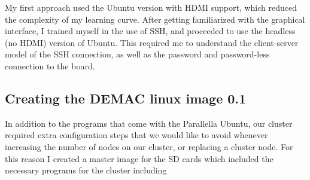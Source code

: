 \documentclass[letterpaper,12pt]{article}
\begin{document}
My first approach used the Ubuntu version with HDMI support, which reduced the complexity of my learning curve. After getting familiarized with the graphical interface, I trained myself in the use of SSH, and proceeded to use the headless (no HDMI) version of Ubuntu. This required me to understand the client-server model of the SSH connection, as well as the password and password-less connection to the board.

\subsection{Creating the DEMAC linux image 0.1} \label{sec:demac_linux_image}
In addition to the programs that come with the Parallella Ubuntu, our cluster required extra configuration steps that we would like to avoid whenever increasing the number of nodes on our cluster, or replacing a cluster node. For this reason I created a master image for the SD cards which included the necessary programs for the cluster including
\end{document}
